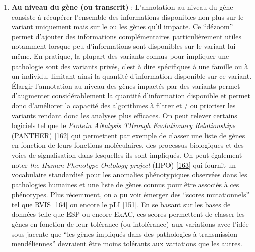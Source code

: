 \documentclass[12pt,a4paper,twoside]{ugathesis}
\providecommand{\tightlist}{%
  \setlength{\itemsep}{0pt}\setlength{\parskip}{0pt}}
\theoremstyle{definition}
\theoremstyle{definition}
\theoremstyle{definition}
\theoremstyle{remark}
\begin{document}
\newpage

\begin{enumerate}
\def\labelenumi{\arabic{enumi}.}
\setcounter{enumi}{1}
\tightlist
\item
  \textbf{Au niveau du gène (ou transcrit)} : L'annotation au niveau du
  gène consiste à récupérer l'ensemble des informations disponibles non
  plus sur le variant uniquement mais sur le ou les gènes qu'il impacte.
  Ce ``dézoom'' permet d'ajouter des informations complémentaires
  particulièrement utiles notamment lorsque peu d'informations sont
  disponibles sur le variant lui-même. En pratique, la plupart des
  variants connus pour impliquer une pathologie sont des variants
  privés, c'est à dire spécifiques à une famille ou à un individu,
  limitant ainsi la quantité d'information disponible sur ce variant.
  Élargir l'annotation au niveau des gènes impactés par des variants
  permet d'augmenter considérablement la quantité d'information
  disponible et permet donc d'améliorer la capacité des algorithmes à
  filtrer et / ou prioriser les variants rendant donc les analyses plus
  efficaces. On peut relever certains logiciels tel que le \emph{Protein
  ANalysis THrough Evolutionary Relationships} (PANTHER)
  {[}\protect\hyperlink{ref-Mi2017}{162}{]} qui permettent par exemple
  de classer une liste de gènes en fonction de leurs fonctions
  moléculaires, des processus biologiques et des voies de signalisation
  dans lesquelles ils sont impliqués. On peut également noter \emph{the
  Human Phenotype Ontology project} (HPO)
  {[}\protect\hyperlink{ref-Kohler2014}{163}{]} qui fournit un
  vocabulaire standardisé pour les anomalies phénotypiques observées
  dans les pathologies humaines et une liste de gènes connus pour être
  associés à ces phénotypes. Plus récemment, on a pu voir émerger des
  ``scores mutationnels'' tel que RVIS
  {[}\protect\hyperlink{ref-Petrovski2013}{164}{]} ou encore le pLI
  {[}\protect\hyperlink{ref-Lek2016}{151}{]}. En se basant sur les bases
  de données telle que ESP ou encore ExAC, ces scores permettent de
  classer les gènes en fonction de leur tolérance (ou intolérance) aux
  variations avec l'idée sous-jacente que ``les gènes impliqués dans des
  pathologies à transmission mendéliennes'' devraient être moins
  tolérants aux variations que les autres.
\end{enumerate}
\end{document}

